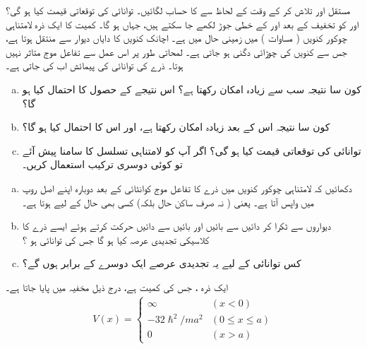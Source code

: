  مستقل  اور   تلاش کر کے وقت کے لحاظ سے  کا حساب لگائیں۔ توانائی کی توقعاتی قیمت کیا ہو گی؟   اور  کو تخفیف کے بعد اور کے خطی جوڑ لکھے جا سکتے ہیں، جہاں  ہو گا۔
 کمیت کا ایک ذرہ لامتناہی چوکور کنویں ( مساوات )  میں زمینی حال میں ہے۔ اچانک کنویں کا دایاں دیوار  سے   منتقل ہوتا ہے،  جس سے کنویں کی چوڑائی دگنی ہو جاتی ہے۔ لمحاتی طور پر اس عمل سے تفاعل موج متاثر نہیں ہوتا۔  ذرے کی توانائی کی پیمائش اب کی جاتی ہے۔
\begin{enumerate}[a.]
\item
 کون سا نتیجہ سب سے زیادہ امکان رکھتا ہے؟ اس نتیجے کے حصول کا احتمال کیا ہو گا؟ 
\item
 کون سا نتیجہ اس کے بعد زیادہ امکان رکھتا ہے،  اور اس کا احتمال کیا ہو گا؟
\item 
توانائی کی توقعاتی قیمت کیا ہو گی؟  اگر آپ کو لامتناہی تسلسل کا سامنا پیش آئے  تو کوئی دوسری ترکیب استعمال کریں۔
\end{enumerate} 
\begin{enumerate}[a.]
\item 
 دکھائیں کہ لامتناہی چوکور کنویں میں   ذرے کا تفاعل موج کوانٹائی  کے بعد دوبارہ اپنے اصل روپ میں واپس آتا ہے۔ یعنی ( نہ صرف ساکن حال  بلکہ)  کسی بھی حال کے لیے   ہوتا ہے۔ 
\item 
 دیواروں سے ٹکرا کر دائیں سے بائیں اور بائیں سے دائیں حرکت کرتے ہوئے   ایسے  ذرے کا کلاسیکی تجدیدی عرصہ کیا ہو گا  جس کی توانائی  ہو ؟ 
\item 
 کس توانائی کے لیے یہ تجدیدی عرصے ایک دوسرے کے برابر ہوں گے؟
\end{enumerate} 
 ایک ذرہ ، جس کی کمیت  ہے،  درج ذیل مخفیہ  میں پایا جاتا ہے۔ 
\begin{align*}
V(x)=
\begin{cases}
\infty & (x< 0)\\
-32\hslash^{2}/ma^{2} & (0\le x \le a)\\
0 & (x> a)
\end{cases}
\end{align*}
